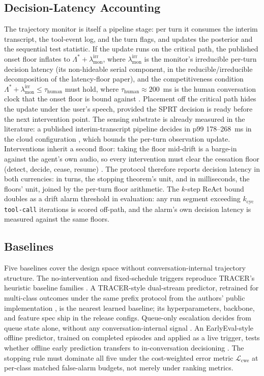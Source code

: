 \subsection{Decision-Latency Accounting}
The trajectory monitor is itself a pipeline stage: per turn it consumes the interim transcript, the tool-event log, and the turn flags, and updates the posterior and the sequential test statistic.
If the update runs on the critical path, the published onset floor inflates to $\Lambda^* + \lambda_{\mathrm{mon}}^{\mathrm{irr}}$, where $\lambda_{\mathrm{mon}}^{\mathrm{irr}}$ is the monitor's irreducible per-turn decision latency (its non-hideable serial component, in the reducible/irreducible decomposition of the latency-floor paper), and the competitiveness condition $\Lambda^* + \lambda_{\mathrm{mon}}^{\mathrm{irr}} \leq \tau_{\mathrm{human}}$ must hold, where $\tau_{\mathrm{human}} \approx 200$~ms is the human conversation clock that the onset floor is bound against \citep{garcia2026latencyfloor}.
Placement off the critical path hides the update under the user's speech, provided the SPRT decision is ready before the next intervention point.
The sensing substrate is already measured in the literature: a published interim-transcript pipeline decides in p99 178--268~ms in the cloud configuration \citep{garcia2026asking}, which bounds the per-turn observation update.
Interventions inherit a second floor: taking the floor mid-drift is a barge-in against the agent's own audio, so every intervention must clear the cessation floor (detect, decide, cease, resume) \citep{garcia2026cessationfloor}.
The protocol therefore reports decision latency in both currencies: in turns, the stopping theorem's unit, and in milliseconds, the floors' unit, joined by the per-turn floor arithmetic.
The $k$-step ReAct bound \citep{garcia2026latencyfloor} doubles as a drift alarm threshold in evaluation: any run segment exceeding $k_{\mathrm{cyc}}$ \texttt{tool-call} iterations is scored off-path, and the alarm's own decision latency is measured against the same floors.

\subsection{Baselines}
Five baselines cover the design space without conversation-internal trajectory structure.
The no-intervention and fixed-schedule triggers reproduce TRACER's heuristic baseline families \citep{nourbakhsh2026tracer}.
A TRACER-style dual-stream predictor, retrained for multi-class outcomes under the same prefix protocol from the authors' public implementation \citep{nourbakhsh2026tracer}, is the nearest learned baseline; its hyperparameters, backbone, and feature spec ship in the release configs.
Queue-only escalation decides from queue state alone, without any conversation-internal signal \citep{queuecontrol2026}.
An EarlyEval-style offline predictor, trained on completed episodes and applied as a live trigger, tests whether offline early prediction transfers to in-conversation decisioning \citep{earlyeval2026}.
The stopping rule must dominate all five under the cost-weighted error metric $\mathcal{L}_{\mathrm{cwe}}$ at per-class matched false-alarm budgets, not merely under ranking metrics.


